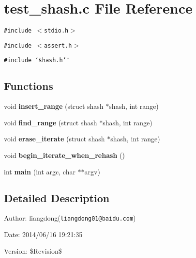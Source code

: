 \section{test\_\-shash.c File Reference}
\label{test__shash_8c}
{\tt \#include $<$stdio.h$>$}\par
{\tt \#include $<$assert.h$>$}\par
{\tt \#include \char`\"{}shash.h\char`\"{}}\par
\subsection*{Functions}
\begin{CompactItemize}
\item 
void {\bf insert\_\-range} (struct shash $\ast$shash, int range)\label{test__shash_8c_a0}

\item 
void {\bf find\_\-range} (struct shash $\ast$shash, int range)\label{test__shash_8c_a1}

\item 
void {\bf erase\_\-iterate} (struct shash $\ast$shash, int range)\label{test__shash_8c_a2}

\item 
void {\bf begin\_\-iterate\_\-when\_\-rehash} ()\label{test__shash_8c_a3}

\item 
int {\bf main} (int argc, char $\ast$$\ast$argv)\label{test__shash_8c_a4}

\end{CompactItemize}


\subsection{Detailed Description}
\begin{Desc}
\item[Author:]liangdong({\tt liangdong01@baidu.com}) \end{Desc}
\begin{Desc}
\item[Date:]2014/06/16 19:21:35 \end{Desc}
\begin{Desc}
\item[Version:]\$Revision\$ \end{Desc}
